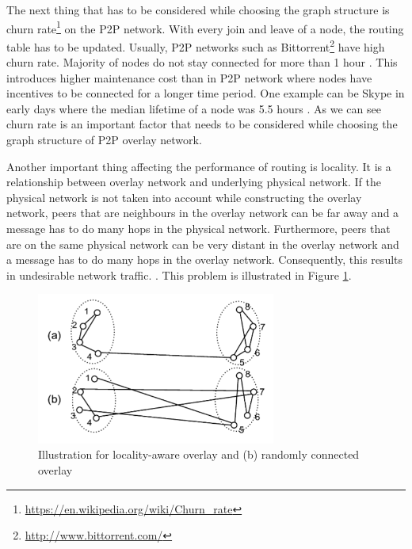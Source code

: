 \quad The next thing that has to be considered while choosing the graph structure is churn rate\footnote{\url{https://en.wikipedia.org/wiki/Churn_rate}} on the P2P network. With every join and leave of a node, the routing table has to be updated. Usually, P2P networks such as Bittorrent\footnote{\url{http://www.bittorrent.com/}} have high churn rate. Majority of nodes do not stay connected for more than 1 hour \cite{stutzbach_understanding_2006}. This introduces higher maintenance cost than in P2P network where nodes have incentives to be connected for a longer time period. One example can be Skype in early days where the median lifetime of a node was 5.5 hours \cite{guha_experimental_2005}. As we can see churn rate is an important factor that needs to be considered while choosing the graph structure of P2P overlay network.

Another important thing affecting the performance of routing is locality. It is a relationship between overlay network and underlying physical network. If the physical network is not taken into account while constructing the overlay network, peers that are neighbours in the overlay network can be far away and a message has to do many hops in the physical network. Furthermore, peers that are on the same physical network can be very distant in the overlay network and a message has to do many hops in the overlay network. Consequently, this results in undesirable network traffic. \cite{zhang_construction_2004}. This problem is illustrated in Figure \ref{fig:localy-aware-overlay}.

\begin{figure}[ht]
	\centering
	\includegraphics[width=0.7\textwidth]{images/localy-aware-overlay-net.png}
	\caption{\label{fig:localy-aware-overlay}Illustration for locality-aware overlay and (b) randomly connected overlay \cite{zhang_construction_2004}}
\end{figure}

